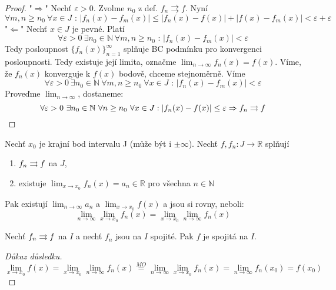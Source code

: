 \begin{proof}
"$\Rightarrow$" 
Nechť $\varepsilon > 0$. Zvolme $n_0$ z def. $f_n \rightrightarrows f$. 
Nyní 
$$\forall m,n \geq n_0 \ \forall x \in J \textrm{ : } |f_n(x) - f_m(x) | \leq |f_n(x) - f(x)| + |f(x) - f_m(x)| < \varepsilon + \varepsilon $$
"$\Leftarrow$"
Nechť $x \in J$ je pevné. Platí $$\forall \varepsilon > 0 \ \exists n_0 \in \mathbb{N} \ \forall m,n \geq n_0 \textrm{ : } |f_n(x) - f_m(x)| < \varepsilon$$
Tedy posloupnost $\{ f_n(x) \}_{n=1}^\infty$ splňuje BC podmínku pro konvergenci posloupnosti. Tedy existuje její limita, označme $\lim_{n \to \infty} f_n(x) = f(x)$. Víme, že $f_n(x)$ konverguje k $f(x)$ bodově, chceme stejnoměrně.
Víme $$\forall \varepsilon > 0 \ \exists n_0 \in \mathbb{N} \ \forall m,n \geq n_0 \ \forall x \in J \textrm{ : } |f_n(x)-f_m(x)|<\varepsilon$$
Proveďme $\lim_{n \to \infty}$, dostaneme:
$$\forall \varepsilon > 0 \ \exists n_0 \in \mathbb{N} \ \forall n \geq n_0 \ \forall x \in J: |f_n(x) - f(x)| \leq \varepsilon \Rightarrow f_n \con f$$
\end{proof}

\begin{vetat}
Nechť $x_0$ je krajní bod intervalu J (může být i $\pm \infty$). Nechť $f, f_n : J \rightarrow \mathbb{R}$ splňují
\begin{enumerate}
\item $f_n \rightrightarrows f$ na $J$,
\item existuje $\lim_{x \rightarrow x_0} f_n(x) = a_n \in \mathbb{R}$ pro všechna $n \in \mathbb{N}$
\end{enumerate}
Pak existují $\lim_{n \rightarrow \infty} a_n$ a $\lim_{x \rightarrow x_0} f(x)$ a jsou si rovny, neboli:
$$\lim_{n \rightarrow \infty} \lim_{x \rightarrow x_0} f_n(x) = \lim_{x \rightarrow x_0} \lim_{n \rightarrow \infty} f_n(x)$$
\end{vetat}

\begin{dusledek}
Nechť $f_n \rightrightarrows f$ na $I$ a nechť $f_n$ jsou na $I$ spojité. Pak $f$ je spojitá na $I$.
\end{dusledek}
\begin{proof}[Důkaz důsledku]
$$\lim_{x \to x_0}f(x) = \lim_{x \to x_0} \lim_{n \to \infty}f_n(x) \overset{MO}{=} \lim_{n \to \infty}\lim_{x \to x_0}f_n(x)=\lim_{n \to \infty}f_n(x_0) = f(x_0)$$
\end{proof}

